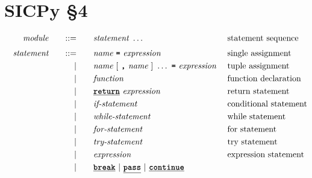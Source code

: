 \section*{SICPy \S4}

\begin{alignat*}{9}
&& \textit{module}    &&\quad ::= &\quad && \textit{statement} \ \ldots
                                                           && \textrm{{statement sequence}} \\[1mm]
&& \textit{statement}    &&\quad ::= &\quad && \textit{name} \ \textbf{\texttt{=}}\  \textit{expression} \
                                                           && \textrm{single assignment} \\
&&                       && |   &\quad && \textit{name} \ [ \ \textbf{\texttt{,}} \ \textit{name} \ ] \ \ldots \
\textbf{\texttt{=}}\ \textit{expression} \ && \textrm{tuple assignment} \\            
&&                       && |   &\quad && \textit{function} \quad
                                                           && \textrm{function declaration}\\
&&                       && |   &\quad && \textbf{\texttt{\underline{return}}}\  \textit{expression} \
                                                           && \textrm{return statement}\\
&&                       && |   &\quad && \textit{if-statement} \quad
                                                           && \textrm{conditional statement}\\
&&                       && |   &\quad && \textit{while-statement} \quad
                                                           && \textrm{while statement}\\
&&                       && |   &\quad && \textit{for-statement} \quad
                                                           && \textrm{for statement}\\
&&                       && |   &\quad && \textit{try-statement} \quad
                                                           && \textrm{try statement}\\                            
&&                       && |   &\quad &&  \textit{expression} \ 
                                                           && \textrm{expression statement} \\
&&                       && |   &\quad && \textbf{\texttt{\underline{break}}} \ | \ \textbf{\texttt{\underline{pass}}} \ | \ \textbf{\texttt{\underline{continue}}} \ \quad &&  \\[1mm]

\end{alignat*}
